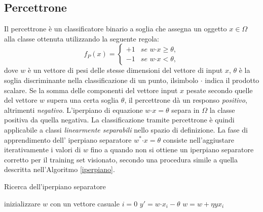 \documentclass [11pt,a4paper,twoside,openright] {book}
\begin{document}
\subsection{Percettrone}
Il percettrone\cite{rosenblatt1958perceptron} è un classificatore binario a soglia che assegna un oggetto $x \in \Omega$ alla classe ottenuta utilizzando la seguente regola:
\begin{equation}
f_P(x)=
\begin{cases}
+1 & \textit{se } w \boldsymbol{\cdot} x \geq \theta, \\
-1 & \textit{se } w \boldsymbol{\cdot} x < \theta,
\end{cases}
\end{equation}
dove $w$ è un vettore di pesi delle stesse dimensioni del vettore di input $x$, $\theta$ è la soglia discriminante nella classificazione di un punto, ilsimbolo $\boldsymbol{\cdot}$ indica il prodotto scalare. Se la somma delle componenti del vettore input $x$ pesate secondo quelle del vettore $w$ supera una certa soglia $\theta$, il percettrone dà un responso \textit{positivo}, altrimenti \textit{negativo}. L'iperpiano di equazione $w \boldsymbol{\cdot} x = \theta$ separa in $\Omega$ la classe positiva da quella negativa. La classificazione tramite percettrone è quindi applicabile a classi \textit{linearmente separabili} nello spazio di definizione. La fase di apprendimento dell' iperpiano separatore $w^* \boldsymbol{\cdot} x = \theta$ consiste nell'aggiustare iterativamente i valori di $w$ fino a quando non si ottiene un iperpiano separatore corretto per il training set visionato, secondo una procedura simile a quella descritta nell'Algoritmo \ref{iperpiano}.
\begin{algorithm}
\caption{Ricerca dell'iperpiano separatore}\label{iperpiano}
\begin{algorithmic}[1]
\State inizializzare $w$ con un vettore casuale
	\State $i=0$
		\State $y' = w \boldsymbol{\cdot} x_i - \theta$
		 $w = w + \eta y x_i$ \EndIf
	\EndWhile
\EndWhile
\end{algorithmic}
\end{algorithm}
\end{document}
